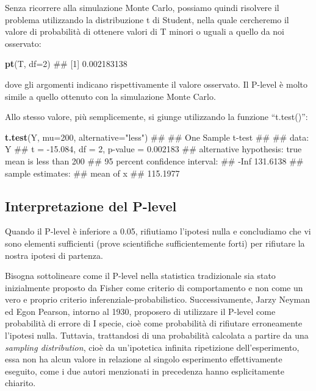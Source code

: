 \documentclass[a4paper,12pt,oneside]{book}
\newenvironment{Shaded}{\begin{snugshade}}{\end{snugshade}}
\newcommand{\KeywordTok}[1]{\textcolor[rgb]{0.13,0.29,0.53}{\textbf{#1}}}
\newcommand{\DataTypeTok}[1]{\textcolor[rgb]{0.13,0.29,0.53}{#1}}
\newcommand{\DecValTok}[1]{\textcolor[rgb]{0.00,0.00,0.81}{#1}}
\newcommand{\StringTok}[1]{\textcolor[rgb]{0.31,0.60,0.02}{#1}}
\newcommand{\NormalTok}[1]{#1}
\theoremstyle{definition}
\theoremstyle{definition}
\theoremstyle{definition}
\theoremstyle{remark}
\begin{document}
Senza ricorrere alla simulazione Monte Carlo, possiamo quindi risolvere
il problema utilizzando la distribuzione t di Student, nella quale
cercheremo il valore di probabilità di ottenere valori di T minori o
uguali a quello da noi osservato:

\begin{Shaded}
\begin{Highlighting}[]
\KeywordTok{pt}\NormalTok{(T, }\DataTypeTok{df=}\DecValTok{2}\NormalTok{)}
\NormalTok{## [1] 0.002183138}
\end{Highlighting}
\end{Shaded}

dove gli argomenti indicano rispettivamente il valore osservato. Il
P-level è molto simile a quello ottenuto con la simulazione Monte Carlo.

Allo stesso valore, più semplicemente, si giunge utilizzando la funzione
``t.test()'':

\begin{Shaded}
\begin{Highlighting}[]
\KeywordTok{t.test}\NormalTok{(Y, }\DataTypeTok{mu=}\DecValTok{200}\NormalTok{, }\DataTypeTok{alternative=}\StringTok{"less"}\NormalTok{)}
\NormalTok{## }
\NormalTok{##  One Sample t-test}
\NormalTok{## }
\NormalTok{## data:  Y}
\NormalTok{## t = -15.084, df = 2, p-value = 0.002183}
\NormalTok{## alternative hypothesis: true mean is less than 200}
\NormalTok{## 95 percent confidence interval:}
\NormalTok{##      -Inf 131.6138}
\NormalTok{## sample estimates:}
\NormalTok{## mean of x }
\NormalTok{##  115.1977}
\end{Highlighting}
\end{Shaded}

\subsection{Interpretazione del
P-level}\label{interpretazione-del-p-level}

Quando il P-level è inferiore a 0.05, rifiutiamo l'ipotesi nulla e
concludiamo che vi sono elementi sufficienti (prove scientifiche
sufficientemente forti) per rifiutare la nostra ipotesi di partenza.

Bisogna sottolineare come il P-level nella statistica tradizionale sia
stato inizialmente proposto da Fisher come criterio di comportamento e
non come un vero e proprio criterio inferenziale-probabilistico.
Successivamente, Jarzy Neyman ed Egon Pearson, intorno al 1930,
proposero di utilizzare il P-level come probabilità di errore di I
specie, cioè come probabilità di rifiutare erroneamente l'ipotesi nulla.
Tuttavia, trattandosi di una probabilità calcolata a partire da una
\emph{sampling distribution}, cioè da un'ipotetica infinita ripetizione
dell'esperimento, essa non ha alcun valore in relazione al singolo
esperimento effettivamente eseguito, come i due autori menzionati in
precedenza hanno esplicitamente chiarito.
\end{document}
